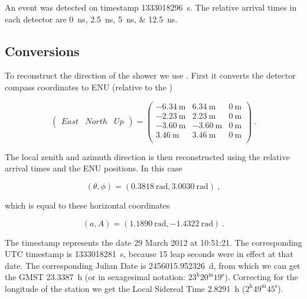 An event was detected on \gps timestamp \SI{1333018296}{\second}. The
relative arrival times in each detector are
\SIlist{0;2.5;5;12.5}{\nano\second}.


\subsection{Conversions}

To reconstruct the direction of the shower we use \sapphire. First it
converts the detector compass coordinates to ENU (relative to the \gps)

\begin{equation}
    \begin{pmatrix}
        \mathit{East} & \mathit{North} & \mathit{Up}
    \end{pmatrix}
        =
    \begin{pmatrix}
        \SI{-6.34}{\meter} & \SI{6.34}{\meter} & \SI{0}{\meter} \\
        \SI{-2.23}{\meter} & \SI{2.23}{\meter} & \SI{0}{\meter} \\
        \SI{-3.60}{\meter} & \SI{-3.60}{\meter} & \SI{0}{\meter} \\
        \SI{3.46}{\meter} & \SI{3.46}{\meter} & \SI{0}{\meter} \\
    \end{pmatrix} \ .
\end{equation}

The local zenith and azimuth direction is then reconstructed using the
relative arrival times and the ENU positions. In this case

\begin{equation}
    (\theta, \phi) = (\SI{0.3818}{\radian}, \SI{3.0030}{\radian}) \ ,
\end{equation}

\noindent which is equal to these horizontal coordinates

\begin{equation}
    (a, A) = (\SI{1.1890}{\radian}, \SI{-1.4322}{\radian}) \ .
\end{equation}

The \gps timestamp represents the date 29 March 2012 at 10:51:21. The
corresponding UTC timestamp is \SI{1333018281}{\second}, because 15 leap
seconds were in effect at that date. The corresponding Julian Date is
\SI{2456015.952326}{\day}, from which we can get the GMST
\SI{23.3387}{\hour} (or in sexagesimal notation:
$23^\mathrm{h}20^\mathrm{m}19^\mathrm{s}$). Correcting for the longitude
of the station we get the Local Sidereal Time \SI{2.8291}{\hour}
($2^\mathrm{h}49^\mathrm{m}45^\mathrm{s}$).

